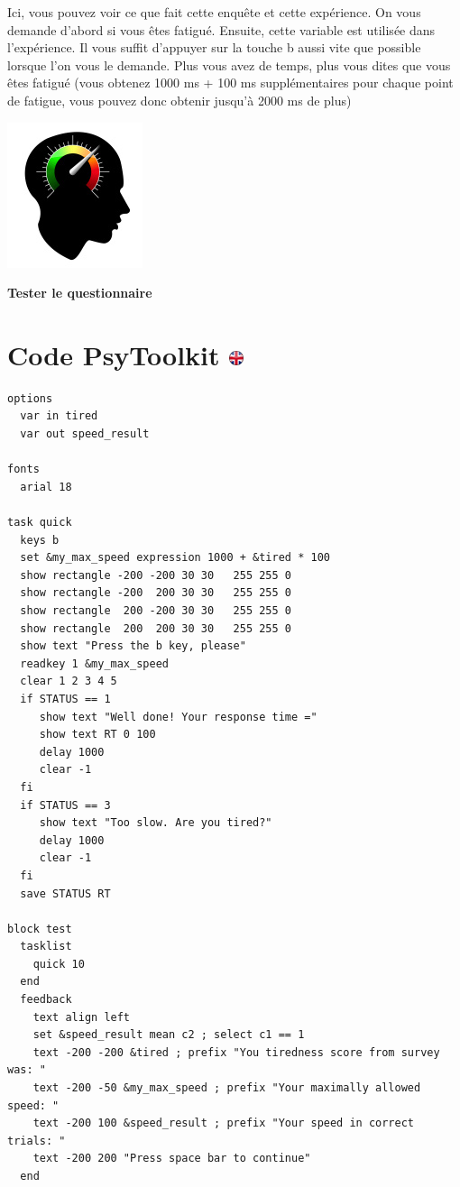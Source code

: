 \documentclass[
]{book}
\begin{document}
Ici, vous pouvez voir ce que fait cette enquête et cette expérience. On vous demande d'abord si vous êtes fatigué. Ensuite, cette variable est utilisée dans l'expérience. Il vous suffit d'appuyer sur la touche b aussi vite que possible lorsque l'on vous le demande. Plus vous avez de temps, plus vous dites que vous êtes fatigué (vous obtenez 1000 ms + 100 ms supplémentaires pour chaque point de fatigue, vous pouvez donc obtenir jusqu'à 2000 ms de plus)

\href{https://www.psytoolkit.org/cgi-bin/psy2.5.1/survey?s=mpXV3}{\includegraphics{img/RT.jpg}}

\textbf{Tester le questionnaire}

\hypertarget{code-psytoolkit}{%
\section[Code PsyToolkit ]{\texorpdfstring{Code PsyToolkit \href{https://www.psytoolkit.org/lessons/var_in_out.html\#_the_psytoolkit_code}{\protect\includegraphics{img/ukflag.png}}}{Code PsyToolkit }}\label{code-psytoolkit}}

\begin{verbatim}
options
  var in tired
  var out speed_result

fonts
  arial 18

task quick
  keys b
  set &my_max_speed expression 1000 + &tired * 100
  show rectangle -200 -200 30 30   255 255 0
  show rectangle -200  200 30 30   255 255 0
  show rectangle  200 -200 30 30   255 255 0
  show rectangle  200  200 30 30   255 255 0
  show text "Press the b key, please"
  readkey 1 &my_max_speed
  clear 1 2 3 4 5
  if STATUS == 1
     show text "Well done! Your response time ="
     show text RT 0 100
     delay 1000
     clear -1
  fi
  if STATUS == 3
     show text "Too slow. Are you tired?"
     delay 1000
     clear -1
  fi
  save STATUS RT

block test
  tasklist
    quick 10
  end
  feedback
    text align left
    set &speed_result mean c2 ; select c1 == 1
    text -200 -200 &tired ; prefix "You tiredness score from survey was: "
    text -200 -50 &my_max_speed ; prefix "Your maximally allowed speed: "
    text -200 100 &speed_result ; prefix "Your speed in correct trials: "
    text -200 200 "Press space bar to continue"
  end
\end{verbatim}
\end{document}
